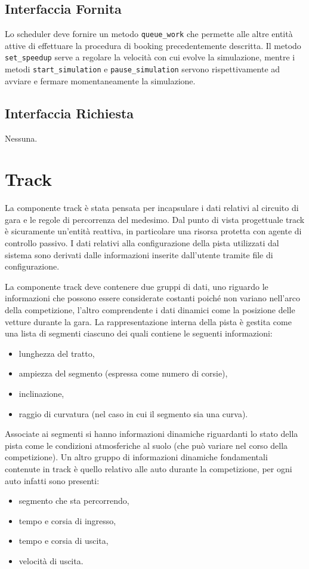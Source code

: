 \documentclass[11pt,a4paper]{report}
\newcommand{\fun}[1]{\texttt{#1}}
\begin{document}
\subsection*{Interfaccia Fornita}
Lo scheduler deve fornire un metodo \fun{queue\_work} che permette alle altre entità attive di effettuare la procedura di booking precedentemente descritta.
Il metodo \fun{set\_speedup} serve a regolare la velocità con cui evolve la simulazione, mentre i metodi \fun{start\_simulation} e \fun{pause\_simulation} servono rispettivamente ad avviare e fermare momentaneamente la simulazione.
\subsection*{Interfaccia Richiesta}
Nessuna.

\section{Track}
La componente track è stata pensata per incapsulare i dati relativi al circuito di gara e le regole di percorrenza del medesimo. Dal punto di vista progettuale track è sicuramente un'entità reattiva, in particolare una risorsa protetta con agente di controllo passivo.
I dati relativi alla configurazione della pista utilizzati dal sistema sono derivati dalle informazioni inserite dall'utente tramite file di configurazione.

La componente track deve contenere due gruppi di dati, uno riguardo le informazioni che possono essere considerate costanti poiché non variano nell'arco della competizione, l'altro comprendente i dati dinamici come la posizione delle vetture durante la gara.
La rappresentazione interna della pista è gestita come una lista di segmenti ciascuno dei quali contiene le seguenti informazioni:
\begin{itemize}
\item lunghezza del tratto,
\item ampiezza del segmento (espressa come numero di corsie),
\item inclinazione,
\item raggio di curvatura (nel caso in cui il segmento sia una curva).
\end{itemize}
Associate ai segmenti si hanno informazioni dinamiche riguardanti lo stato della pista come le condizioni atmosferiche al suolo (che può variare nel corso della competizione).
Un altro gruppo di informazioni dinamiche fondamentali contenute in track è quello relativo alle auto durante la competizione, per ogni auto infatti sono presenti:
\begin{itemize}
\item segmento che sta percorrendo,
\item tempo e corsia di ingresso,
\item tempo e corsia di uscita,
\item velocità di uscita.
\end{itemize}
\end{document}
